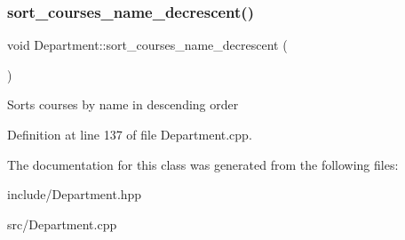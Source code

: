 \subsubsection{\texorpdfstring{sort\+\_\+courses\+\_\+name\+\_\+decrescent()}{sort\_courses\_name\_decrescent()}}
{\footnotesize\ttfamily void Department\+::sort\+\_\+courses\+\_\+name\+\_\+decrescent (\begin{DoxyParamCaption}{ }\end{DoxyParamCaption})}

Sorts courses by name in descending order 

Definition at line 137 of file Department.\+cpp.



The documentation for this class was generated from the following files\+:\begin{DoxyCompactItemize}
\item 
include/Department.\+hpp\item 
src/Department.\+cpp\end{DoxyCompactItemize}
